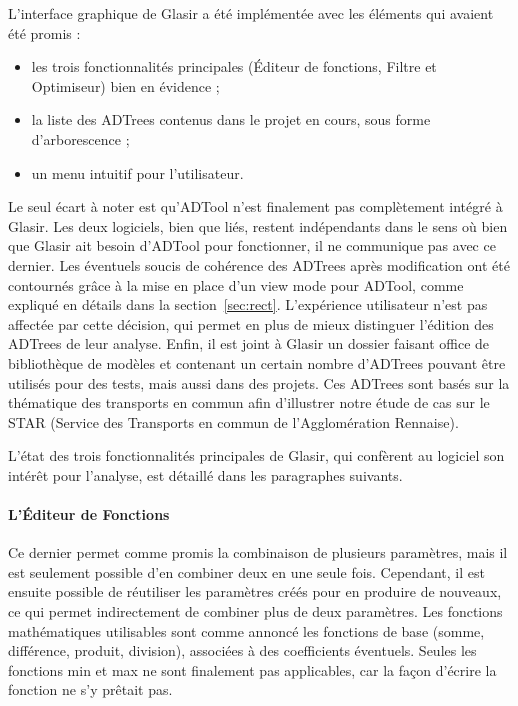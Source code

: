 L'interface graphique de Glasir a été implémentée avec les éléments qui avaient été promis : 
\begin{itemize}
    \item les trois fonctionnalités principales (Éditeur de fonctions, Filtre et Optimiseur) bien en évidence ;
    \item la liste des ADTrees contenus dans le projet en cours, sous forme d'arborescence ;
    \item un menu intuitif pour l'utilisateur.
\end{itemize}
Le seul écart à noter est qu'ADTool n'est finalement pas complètement intégré à Glasir. Les deux logiciels, bien que liés, restent indépendants dans le sens où bien que Glasir ait besoin d'ADTool pour fonctionner, il ne communique pas avec ce dernier. Les éventuels soucis de cohérence des ADTrees après modification ont été contournés grâce à la mise en place d'un \og view mode \fg{} pour ADTool, comme expliqué en détails dans la {\sc section}~\ref{sec:rect}. L'expérience utilisateur n'est pas affectée par cette décision, qui permet en plus de mieux distinguer l'édition des ADTrees de leur analyse. Enfin, il est joint à Glasir un dossier faisant office de bibliothèque de modèles et contenant un certain nombre d'ADTrees pouvant être utilisés pour des tests, mais aussi dans des projets. Ces ADTrees sont basés sur la thématique des transports en commun afin d'illustrer notre étude de cas sur le STAR (Service des Transports en commun de l'Agglomération Rennaise).

L'état des trois fonctionnalités principales de Glasir, qui confèrent au logiciel son intérêt pour l'analyse, est détaillé dans les paragraphes suivants.

\paragraph{L'Éditeur de Fonctions} Ce dernier permet comme promis la combinaison de plusieurs paramètres, mais il est seulement possible d'en combiner deux en une seule fois. Cependant, il est ensuite possible de réutiliser les paramètres créés pour en produire de nouveaux, ce qui permet indirectement de combiner plus de deux paramètres. Les fonctions mathématiques utilisables sont comme annoncé les fonctions de base (somme, différence, produit, division), associées à des coefficients éventuels. Seules les fonctions min et max ne sont finalement pas applicables, car la façon d'écrire la fonction ne s'y prêtait pas.

